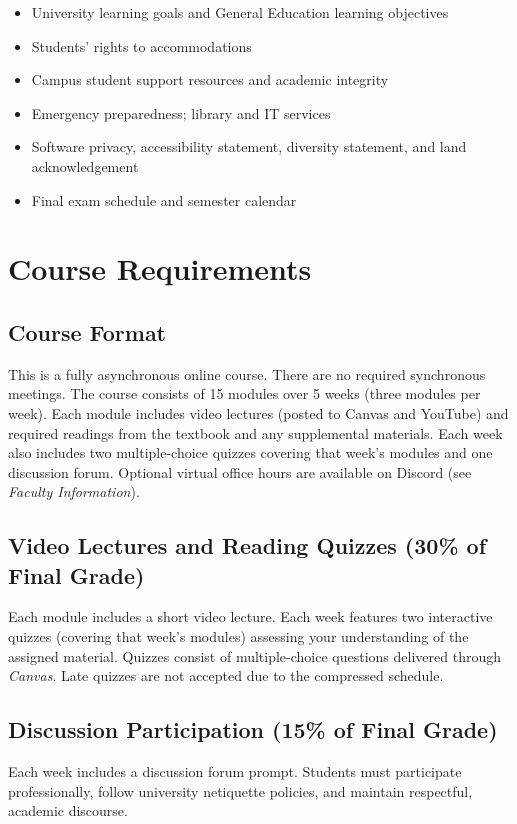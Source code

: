 \documentclass[12pt]{article}
\begin{document}
\begin{itemize}
\item University learning goals and General Education learning objectives
\item Students' rights to accommodations
\item Campus student support resources and academic integrity
\item Emergency preparedness; library and IT services
\item Software privacy, accessibility statement, diversity statement, and land acknowledgement
\item Final exam schedule and semester calendar
\end{itemize}

\section*{Course Requirements}

\subsection*{Course Format}
This is a fully asynchronous online course. There are no required synchronous meetings. The course consists of 15 modules over 5 weeks (three modules per week). Each module includes video lectures (posted to Canvas and YouTube) and required readings from the textbook and any supplemental materials. Each week also includes two multiple-choice quizzes covering that week's modules and one discussion forum. Optional virtual office hours are available on Discord (see \emph{Faculty Information}).

\subsection*{Video Lectures and Reading Quizzes (30\% of Final Grade)}
Each module includes a short video lecture. Each week features two interactive quizzes (covering that week's modules) assessing your understanding of the assigned material. Quizzes consist of multiple-choice questions delivered through \emph{Canvas}. Late quizzes are not accepted due to the compressed schedule.

\subsection*{Discussion Participation (15\% of Final Grade)}
Each week includes a discussion forum prompt. Students must participate professionally, follow university netiquette policies, and maintain respectful, academic discourse.
\end{document}

